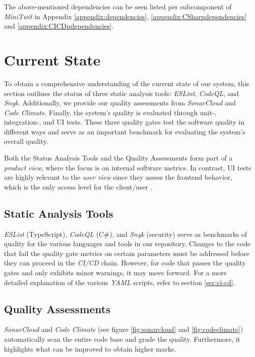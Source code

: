 The above-mentioned dependencies can be seen listed per subcomponent of \textit{MiniTwit} in Appendix \ref{appendix:dependencies}, \ref{appendix:CSharpdependencies} and \ref{appendix:CICDpdependencies}.

\section{Current State}

To obtain a comprehensive understanding of the current state of our system, this section outlines the status of three static analysis tools: \textit{ESLint}, \textit{CodeQL}, and \textit{Snyk}. Additionally, we provide our quality assessments from \textit{SonarCloud} and \textit{Code Climate}. Finally, the system's quality is evaluated through unit-, integration-, and UI tests. These three quality gates test the software quality in different ways and serve as an important benchmark for evaluating the system's overall quality.

Both the Status Analysis Tools and the Quality Assessments form part of a \textit{product view}, where the focus is on internal software metrics. In contrast, UI tests are highly relevant to the \textit{user view} since they assess the frontend behavior, which is the only access level for the client/user \cite[pp. 13-15]{kitchenham1996software}.

\subsection{Static Analysis Tools}

\textit{ESList} (TypeScript), \textit{CodeQL} (C\#), and \textit{Snyk} (security) serve as benchmarks of quality for the various languages and tools in our repository. Changes to the code that fail the quality gate metrics on certain parameters must be addressed before they can proceed in the \textit{CI/CD} chain. However, for code that passes the quality gates and only exhibits minor warnings, it may move forward. For a more detailed explanation of the various \textit{YAML} scripts, refer to section \ref{sec:ci-cd}.

\subsection{Quality Assessments}

\textit{SonarCloud} and \textit{Code Climate} (see figure \ref{fig:sonarcloud} and \ref{fig:codeclimate}) automatically scan the entire code base and grade the quality. Furthermore, it highlights what can be improved to obtain higher marks.


